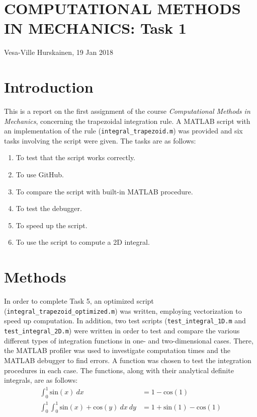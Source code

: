 \documentclass{article}
\begin{document}
	\section*{COMPUTATIONAL METHODS IN MECHANICS: Task 1}
	Vesa-Ville Hurskainen, 19 Jan 2018
	
	\section*{Introduction}
	This is a report on the first assignment of the course \textit{Computational Methods in Mechanics}, concerning the trapezoidal integration rule. A MATLAB script with an implementation of the rule (\texttt{integral\_trapezoid.m}) was provided and six tasks involving the script were given. The tasks are as follows:
	
	\begin{enumerate}
		\setlength\itemsep{0pt}
		\item To test that the script works correctly.
		\item To use GitHub.
		\item To compare the script with built-in MATLAB procedure.
		\item To test the debugger.
		\item To speed up the script.
		\item To use the script to compute a 2D integral.
	\end{enumerate}
	
	\section*{Methods}
	In order to complete Task 5, an optimized script (\texttt{integral\_trapezoid\_optimized.m}) was written, employing vectorization to speed up computation. In addition, two test scripts (\texttt{test\_integral\_1D.m} and \texttt{test\_integral\_2D.m}) were written in order to test and compare the various different types of integration functions in one- and two-dimensional cases. There, the MATLAB profiler was used to investigate computation times and the MATLAB debugger to find errors. A function was chosen to test the integration procedures in each case. The functions, along with their analytical definite integrals, are as follows:
	\begin{align}
	\int_{0}^{1} \textrm{sin}(x)~dx &= 1-\textrm{cos}(1) \\
	\int_{0}^{1} \int_{0}^{1} \textrm{sin}(x) + \textrm{cos}(y)~dx~dy &= 1 + \textrm{sin}(1) - \textrm{cos}(1)
	\end{align}
	
\end{document}
